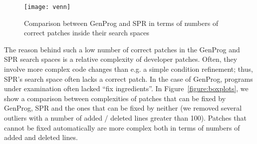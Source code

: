 \begin{figure}
    \centering
    \texttt{[image: venn]}
    \vspace{0.1in}
    \caption{Comparison between GenProg and SPR in terms of numbers of correct patches inside their search spaces}
    \label{figure:venn}
\end{figure}

The reason behind such a low number of correct patches in the GenProg and SPR search spaces is a relative complexity of developer patches. Often, they involve more complex code changes than e.g. a simple condition refinement; thus, SPR's search space often lacks a correct patch. In the case of GenProg, programs under examination often lacked ``fix ingredients''. In Figure~\ref{figure:boxplots}, we show a comparison between complexities of patches that can be fixed by GenProg, SPR and the ones that can be fixed by neither (we removed several outliers with a number of added / deleted lines greater than 100). Patches that cannot be fixed automatically are more complex both in terms of numbers of added and deleted lines.

